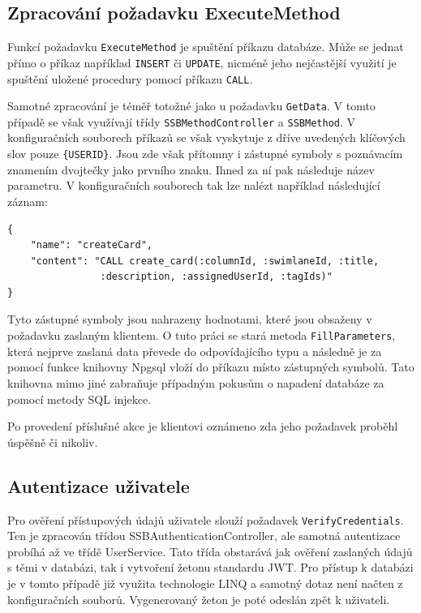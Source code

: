 \subsection{Zpracování požadavku ExecuteMethod}
Funkcí požadavku \texttt{ExecuteMethod} je spuštění příkazu databáze. Může se jednat přímo o příkaz například \texttt{INSERT} či \texttt{UPDATE}, nicméně jeho nejčastější využití je spuštění uložené procedury pomocí příkazu \texttt{CALL}.

Samotné zpracování je téměř totožné jako u požadavku \texttt{GetData}. V tomto případě se však využívají třídy \texttt{SSBMethodController} a \texttt{SSBMethod}. V konfiguračních souborech příkazů se však vyskytuje z dříve uvedených klíčových slov pouze \texttt{\{USERID\}}. Jsou zde však přítomny i zástupné symboly s poznávacím znamením dvojtečky jako prvního znaku. Ihned za ní pak následuje název parametru. V konfiguračních souborech tak lze nalézt například následující záznam:

\begin{verbatim}
{
    "name": "createCard",
    "content": "CALL create_card(:columnId, :swimlaneId, :title,
                :description, :assignedUserId, :tagIds)"
}
\end{verbatim}

Tyto zástupné symboly jsou nahrazeny hodnotami, které jsou obsaženy v požadavku zaslaným klientem. O tuto práci se stará metoda \texttt{FillParameters}, která nejprve zaslaná data převede do odpovídajícího typu a následně je za pomocí funkce knihovny Npgsql vloží do příkazu místo zástupných symbolů. Tato knihovna mimo jiné zabraňuje případným pokusům o napadení databáze za pomocí metody SQL injekce. 

Po provedení příslušné akce je klientovi oznámeno zda jeho požadavek proběhl úspěšně či nikoliv.

\subsection{Autentizace uživatele}
Pro ověření přístupových údajů uživatele slouží požadavek \texttt{VerifyCredentials}. Ten je zpracován třídou SSBAuthenticationController, ale samotná autentizace probíhá až ve třídě UserService. Tato třída obstarává jak ověření zaslaných údajů s těmi v databázi, tak i vytvoření žetonu standardu JWT. Pro přístup k databázi je v tomto případě již využita technologie LINQ a samotný dotaz není načten z konfiguračních souborů. Vygenerovaný žeton je poté odeslán zpět k uživateli.




